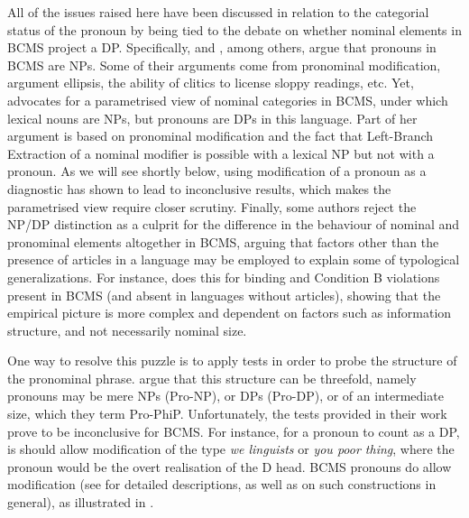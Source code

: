 \documentclass[output=paper,colorlinks,citecolor=brown]{langscibook}
\begin{document}
All of the issues raised here have been discussed in relation to the categorial status of the pronoun by being tied to the debate on whether nominal elements in BCMS project a DP. Specifically, \citet{despic11} and \citet{runic14}, among others, argue that pronouns in BCMS are NPs. Some of their arguments come from pronominal modification, argument ellipsis, the ability of clitics to license sloppy readings, etc. Yet, \citet{beslinNPDP} advocates for a parametrised view of nominal categories in BCMS, under which lexical nouns are NPs, but pronouns are DPs in this language. Part of her argument is based on pronominal modification and the fact that Left-Branch Extraction of a nominal modifier is possible with a lexical NP but
not with a pronoun. As we will see shortly below, using modification of a pronoun as a diagnostic has shown to lead to inconclusive results, which makes the parametrised view require closer scrutiny. Finally, some authors reject the NP/DP distinction as a culprit for the difference in the behaviour of nominal and pronominal elements altogether in BCMS, arguing that factors other than the presence of articles in a language may be employed to explain some of  typological generalizations. For instance, \citet{jovovic22} does this for binding and Condition B violations present in BCMS (and absent in languages without articles), showing that the empirical picture is more complex and dependent on factors such as information structure, and not necessarily nominal size. 

One way to resolve this puzzle is to apply tests in order to probe the structure of the pronominal phrase. \citet{dechainewiltschko} argue that this structure can be threefold, namely pronouns may be mere NPs (Pro-NP), or DPs (Pro-DP), or of an intermediate size, which they term Pro-PhiP. Unfortunately, the tests provided in their work prove to be inconclusive for BCMS. For instance, for a pronoun to count as a DP, is should allow modification of the type \textit{we linguists} or \textit{you poor thing}, where the pronoun would be the overt realisation of the D head. BCMS pronouns do allow modification (see \citealt{progovac98,pus:boskovic08,despic11,runic14,arsenijevicnominalstructure,beslinNPDP} for detailed descriptions, as well as \citealt{hohn15} on such constructions in general), as illustrated in . 
\end{document}

